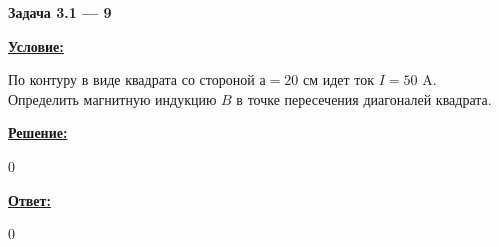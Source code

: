 
\begin{center}
    \textbf{Задача 3.1 --- 9}
\end{center}

\underline{\textbf{Условие:}}

По контуру в виде квадрата со стороной $ а = 20 $ см идет ток $ I = 50 $ A. Определить магнитную индукцию $ B $ в точке пересечения диагоналей квадрата.

\underline{\textbf{Решение:}}

0

\underline{\textbf{Ответ:}}

0
